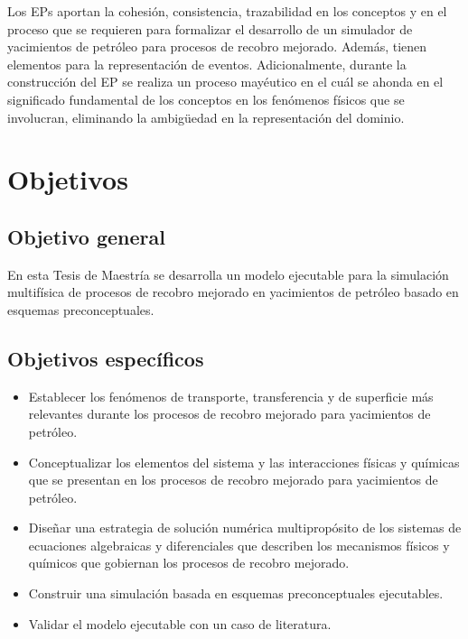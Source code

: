 Los EPs aportan la cohesión, consistencia, trazabilidad en los conceptos y en el proceso que se requieren para formalizar el desarrollo de un simulador de yacimientos de petróleo para procesos de recobro mejorado. Además, tienen elementos para la representación de eventos. Adicionalmente, durante la construcción del EP se realiza un proceso mayéutico en el cuál se ahonda en el significado fundamental de los conceptos en los fenómenos físicos que se involucran, eliminando la ambigüedad en la representación del dominio.%

\section{Objetivos}
\subsection{Objetivo general}
En esta Tesis de Maestría se desarrolla un modelo ejecutable para la simulación multifísica de procesos de recobro mejorado en yacimientos de petróleo basado en esquemas preconceptuales.
\subsection{Objetivos específicos}
\begin{itemize}
	\item Establecer los fenómenos de transporte, transferencia y de superficie más relevantes durante los procesos de recobro mejorado para yacimientos de petróleo.
	\item Conceptualizar los elementos del sistema y las interacciones físicas y químicas que se presentan en los procesos de recobro mejorado para yacimientos de petróleo.
	\item Diseñar una estrategia de solución numérica multipropósito de los sistemas de ecuaciones algebraicas y diferenciales que describen los mecanismos físicos y químicos que gobiernan los procesos de recobro mejorado.
	\item Construir una simulación basada en esquemas preconceptuales ejecutables.
	\item Validar el modelo ejecutable con un caso de literatura.
\end{itemize}